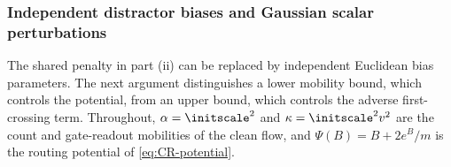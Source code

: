 \subsubsection{Independent distractor biases and Gaussian scalar perturbations}
\label{app:CR-independent}

The shared penalty in part (ii) can be replaced by independent Euclidean bias parameters.
The next argument distinguishes a lower mobility bound, which controls the potential,
from an upper bound, which controls the adverse first-crossing term.
Throughout, $\alpha=\initscale^2$ and $\kappa=\initscale^2v^2$ are the count and gate-readout mobilities of the clean flow, and
$\Psi(B)=B+2e^B/m$ is the routing potential of \cref{eq:CR-potential}.

